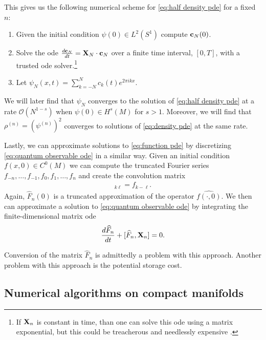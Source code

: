 \documentclass[12pt]{amsart}
\begin{document}
This gives us the following numerical scheme for \eqref{eq:half density pde} for a fixed $n$:

\begin{enumerate}
	\item Given the initial condition $\psi(0) \in L^2(S^1)$ compute ${\bf c}_N(0)$.
	\item Solve the ode $\frac{d {\bf c}_N }{dt} = {\bf X}_N \cdot {\bf c}_N$ over a finite time interval, $[0,T]$,
	with a trusted ode solver.\footnote{If ${\bf X}_n$ is constant in time, than one can solve this ode using a matrix exponential, but this could be treacherous
	and needlessly expensive \cite{Moler2003}.}
	\item Let $\psi_{N}(x,t) = \sum_{k=-N}^N c_k(t) e^{2\pi ikx}$. 
\end{enumerate}
We will later find that $\psi_{N}$ converges to the solution of \eqref{eq:half density pde} at a rate $\mathcal{O}( N^{1-s})$ when $\psi(0) \in H^{s}(M)$ for $s > 1$.
Moreover, we will find that $\rho^{(n)} = ( \psi^{(n)} )^2$ converges to solutions of \eqref{eq:density pde} at the same rate.

Lastly, we can approximate solutions to \eqref{eq:function pde}
by discretizing \eqref{eq:quantum observable ode} in a similar way.
Given an initial condition $f(x,0) \in C^0(M)$ we can compute the truncated Fourier series $f_{-n},\dots,f_{-1},f_0,f_1,\dots,f_n$ and create the convolution matrix
\begin{align*}
	[ \widehat{F}_n(0) ]_{k \ell} = f_{k-\ell}.
\end{align*}
Again, $\widehat{F}_n(0)$ is a truncated approximation of the operator $\widehat{f( \cdot , 0)}$.
We then can approximate a solution to \eqref{eq:quantum observable ode}
 by integrating the finite-dimensional matrix ode
\begin{align*}
	\frac{d \widehat{F}_n }{dt} + [ \widehat{F}_n , {\bf X}_n ] = 0.
\end{align*}

Conversion of the matrix $\widehat{F}_n$ is admittedly a problem with this approach.  Another problem with this approach is the potential storage cost.

\subsection{Numerical algorithms on compact manifolds}
\end{document}

